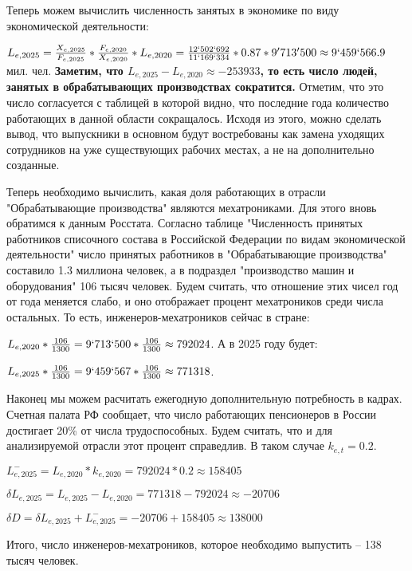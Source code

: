 Теперь можем вычислить численность занятых в экономике по виду экономической деятельности:
\par
$L_{e, 2025} = \frac{X_{e, 2025}}{F_{e, 2025}} * \frac{F_{e, 2020}}{X_{e, 2020}} * L_{e, 2020} = \frac{12`502`692}{11`169`334} * 0.87 * 9'713'500 \approx 9`459`566.9$ мил. чел.
\newline
\textbf{Заметим, что $L_{e, 2025} -  L_{e, 2020} \approx -253933$, то есть число людей, занятых в 
обрабатывающих производствах сократится.} Отметим, что это число согласуется с таблицей\cite{workers-count} в которой видно, что последние года количество работающих в данной области сокращалось.
Исходя из этого, можно сделать вывод, что выпускники в основном будут востребованы как замена уходящих сотрудников на уже существующих рабочих местах, а не на дополнительно созданные.
\par
Теперь необходимо вычислить, какая доля работающих в отрасли "Обрабатывающие производства" являются мехатрониками. Для этого вновь обратимся к данным Росстата. Согласно таблице "Численность принятых работников списочного состава в Российской Федерации по видам экономической деятельности"\cite{work-count-VED} число принятых работников в "Обрабатывающие производства" 
составило 1.3 миллиона человек, а в подраздел "производство машин и оборудования" 106 тысяч человек.
Будем считать, что отношение этих чисел год от года меняется слабо, и оно отображает процент 
мехатроников среди числа остальных. То есть, инженеров-мехатроников сейчас в стране:
\par
$L_{e,2020}* \frac{106}{1300} = 9`713`500 * \frac{106}{1300} \approx 792024 $.
\newline
А в 2025 году будет:
\par
$L_{e,2025}* \frac{106}{1300} = 9`459`567 * \frac{106}{1300} \approx 771318 $.

Наконец мы можем расчитать ежегодную дополнительную потребность в кадрах. 
Счетная палата РФ сообщает, что число работающих пенсионеров в России достигает 20\% от
числа трудоспособных. Будем считать, что и для анализируемой отрасли этот процент справедлив.
В таком случае $k_{e,t} = 0.2$.
\par
$L_{e, 2025}^{-} =  L_{e, 2020} * k_{e, 2020} = 792024 * 0.2 \approx 158405$

$\delta L_{e, 2025} = L_{e, 2025} - L_{e, 2020} = 771318 - 792024 \approx -20706$

$\delta D = \delta L_{e, 2025} + L_{e, 2025}^{-} = -20706 + 158405 \approx 138000$

Итого, число инженеров-мехатроников, которое необходимо выпустить -- 138 тысяч человек.
\clearpage
